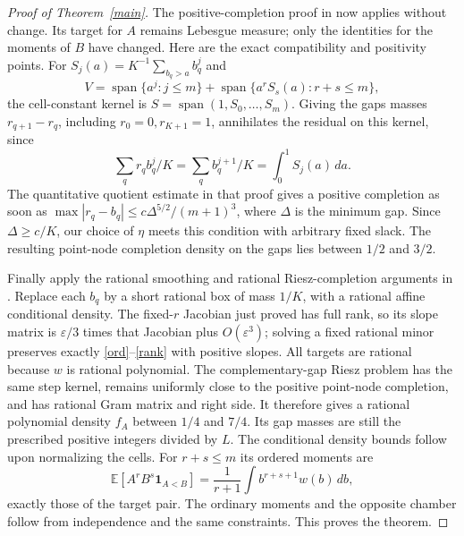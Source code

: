 \documentclass[11pt]{article}
\begin{document}
\begin{proof}[Proof of Theorem~\ref{main}]
The positive-completion proof in
now applies without change. Its target for $A$ remains Lebesgue
measure; only the identities for the moments of $B$ have changed.
Here are the exact compatibility and positivity points.
For $S_j(a)=K^{-1}\sum_{b_q>a}b_q^j$ and
\[
 V=\operatorname{span}\{a^j:j\le m\}
   +\operatorname{span}\{a^rS_s(a):r+s\le m\},
\]
the cell-constant kernel is $S=\operatorname{span}(1,S_0,\ldots,S_m)$.
Giving the gaps masses $r_{q+1}-r_q$, including $r_0=0,r_{K+1}=1$,
annihilates the residual on this kernel, since
\[
 \sum_q r_q b_q^j/K=\sum_q b_q^{j+1}/K=\int_0^1 S_j(a)\,da.
\]
The quantitative quotient estimate in that proof gives a positive
completion as soon as
$\max|r_q-b_q|\le c\Delta^{5/2}/(m+1)^3$, where $\Delta$ is the
minimum gap. Since $\Delta\ge c/K$, our choice of $\eta$ meets this
condition with arbitrary fixed slack. The resulting point-node
completion density on the gaps lies between $1/2$ and $3/2$.

Finally apply the rational smoothing and rational Riesz-completion
arguments in .
Replace each $b_q$ by a short rational box of mass $1/K$, with a
rational affine conditional density. The fixed-$r$ Jacobian just
proved has full rank, so its slope matrix is $\varepsilon/3$ times
that Jacobian plus $O(\varepsilon^3)$; solving a fixed rational minor
preserves exactly \eqref{ord}--\eqref{rank} with positive slopes.
All targets are rational because $w$ is rational polynomial.
The complementary-gap Riesz problem has the same step kernel, remains
uniformly close to the positive point-node completion, and has rational
Gram matrix and right side. It therefore gives a rational polynomial
density $f_A$ between $1/4$ and $7/4$. Its gap masses are still the
prescribed positive integers divided by $L$. The conditional density
bounds follow upon normalizing the cells.
For $r+s\le m$ its ordered moments are
\[
 \mathbb E[A^rB^s\mathbf1_{A<B}]
 =\frac1{r+1}\int b^{r+s+1}w(b)\,db,
\]
exactly those of the target pair. The ordinary moments and the opposite
chamber follow from independence and the same constraints. This proves
the theorem.
\end{proof}
\end{document}
